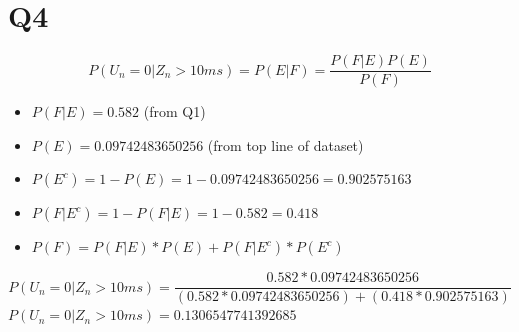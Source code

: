 \documentclass[a4paper,11pt]{article}
\theoremstyle{mytheor}
\begin{document}
\section*{Q4}
    $$ P(U_n=0|Z_n > 10ms) = P(E|F) = \frac{P(F|E)P(E)}{P(F)} $$
    \begin{itemize}
        \item $ P(F|E) = 0.582 $ (from Q1)
        \item $ P(E) = 0.09742483650256 $ (from top line of dataset)
        \item $ P(E^c) = 1-P(E) = 1-0.09742483650256 = 0.902575163 $
        \item $ P(F|E^c) = 1-P(F|E) = 1-0.582 = 0.418 $
        \item $ P(F) = P(F|E)*P(E) + P(F|E^c)*P(E^c) $
    \end{itemize}

    $$ P(U_n=0|Z_n > 10ms) = \frac{0.582 * 0.09742483650256}{(0.582 * 0.09742483650256)+(0.418*0.902575163)} $$
    $ P(U_n=0|Z_n > 10ms) = 0.1306547741392685 $
\end{document}
